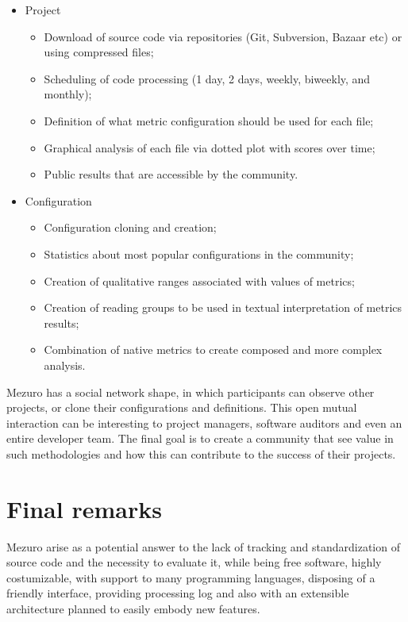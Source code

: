 \documentclass{llncs}
\begin{document}
\begin{itemize}
    \item Project

    \begin{itemize}
        \item Download of source code via repositories (Git, Subversion, Bazaar etc) or using compressed files;
        \item Scheduling of code processing (1 day, 2 days, weekly, biweekly, and monthly);
        \item Definition of what metric configuration should be used for each file;
        \item Graphical analysis of each file via dotted plot with scores over time;
        \item Public results that are accessible by the community.
    \end{itemize}
    \item Configuration
    \begin{itemize}
        \item Configuration cloning and creation;
        \item Statistics about most popular configurations in the community;
        \item Creation of qualitative ranges associated with values of metrics;
        \item Creation of reading groups to be used in textual interpretation of metrics results;
        \item Combination of native metrics to create composed and more complex analysis.
    \end{itemize}
\end{itemize}


Mezuro has a social network shape, in which participants can observe other
projects, or clone their configurations and definitions. This open mutual
interaction can be interesting to project managers, software
auditors and even an entire developer team. The final goal is to create a
community that see value in such methodologies and how this can contribute
to the success of their projects.

\section{Final remarks}

Mezuro arise as a potential answer to the lack of tracking and standardization
of source code and the necessity to evaluate it, while being free software,
highly costumizable, with support to many programming languages, disposing of
a friendly interface, providing processing log and also with an extensible
architecture planned to easily embody new features.




\end{document}

